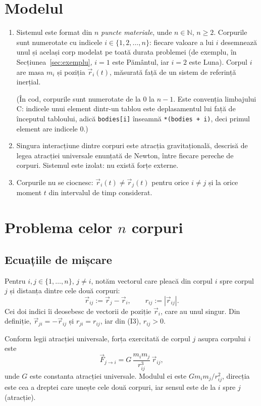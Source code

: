 \documentclass[11pt,a4paper]{article}
\newcommand{\vr}{\vec r}
\begin{document}
\section{Modelul}\label{sec:model}
\begin{enumerate}[label=(I\arabic*)]
  \item Sistemul este format din $n$ \emph{puncte materiale}, unde $n \in \mathbb{N}$, $n \ge 2$. Corpurile sunt numerotate cu indicele $i \in \{1, 2, \dots, n\}$: fiecare valoare a lui $i$ desemnează unul și același corp modelat pe toată durata problemei (de exemplu, în Secțiunea~\ref{sec:exemplu}, $i = 1$ este Pământul, iar $i = 2$ este Luna). Corpul $i$ are masa $m_i$ și poziția $\vr_i(t)$, măsurată față de un sistem de referință inerțial.

  (În cod, corpurile sunt numerotate de la $0$ la $n - 1$. Este convenția limbajului C: indicele unui element dintr-un tablou este deplasamentul lui față de începutul tabloului, adică \texttt{bodies[i]} înseamnă \texttt{*(bodies + i)}, deci primul element are indicele $0$.)
  \item Singura interacțiune dintre corpuri este atracția gravitațională, descrisă de legea atracției universale enunțată de Newton, între fiecare pereche de corpuri. Sistemul este izolat: nu există forțe externe.
  \item Corpurile nu se ciocnesc: $\vr_i(t) \neq \vr_j(t)$ pentru orice $i \neq j$ și la orice moment $t$ din intervalul de timp considerat.
\end{enumerate}

\section{Problema celor $n$ corpuri}\label{sec:N}

\subsection*{Ecuațiile de mișcare}
Pentru $i, j \in \{1, \dots, n\}$, $j \neq i$, notăm vectorul care pleacă din corpul $i$ spre corpul $j$ și distanța dintre cele două corpuri:
\[
  \vr_{ij} := \vr_j - \vr_i, \qquad r_{ij} := |\vr_{ij}| .
\]
Cei doi indici îi deosebesc de vectorii de poziție $\vr_i$, care au unul singur. Din definiție, $\vr_{ji} = -\vr_{ij}$ și $r_{ji} = r_{ij}$, iar din (I3), $r_{ij} > 0$.

Conform legii atracției universale, forța exercitată de corpul $j$ asupra corpului $i$ este
\begin{equation}
  \vec F_{j\to i} = G\,\frac{m_i m_j}{r_{ij}^{3}}\,\vr_{ij}, \label{eq:forta}
\end{equation}
unde $G$ este constanta atracției universale. Modulul ei este $G m_i m_j / r_{ij}^2$, direcția este cea a dreptei care unește cele două corpuri, iar sensul este de la $i$ spre $j$ (atracție).
\end{document}
